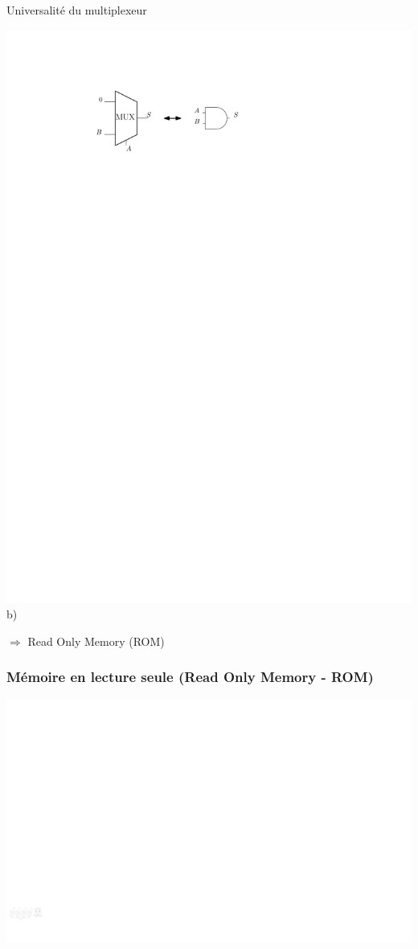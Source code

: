 \documentclass{beamer}
\begin{document}
\begin{frame}
\begin{block}{Universalité du multiplexeur}
\begin{minipage}[c]{0.4\linewidth}
\includegraphics[width=\linewidth]{Figs/and_mux2.pdf}\\\centering b)
   \end{minipage}
\end{block}

$\Rightarrow$ Read Only Memory (ROM)
\end{frame}

\begin{frame}
\frametitle{Mémoire en lecture seule (Read Only Memory - ROM)}
\centering\includegraphics[width=\linewidth]{Figs/rom_inner.pdf}
\end{frame}
\end{document}
